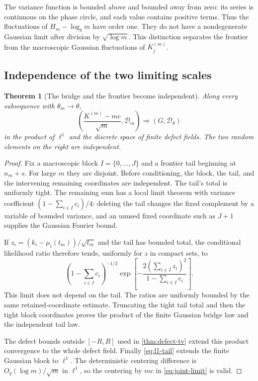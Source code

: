 \documentclass[11pt,a4paper]{article}
\numberwithin{equation}{section}
\newtheorem{theorem}{Theorem}[section]
\theoremstyle{definition}
\theoremstyle{remark}
\begin{document}
The variance function is bounded above and bounded away from zero: its
series is continuous on the phase circle, and each value contains positive
terms. Thus the fluctuations of $H_m-\log_bm$ have order one. They do
not have a nondegenerate Gaussian limit after division by
$\sqrt{\log m}$. This distinction separates the frontier from the
macroscopic Gaussian fluctuations of $K_j^{(m)}$.

\subsection{Independence of the two limiting scales}
\begin{theorem}[The bridge and the frontier become independent]
\label{thm:independence}
Along every subsequence with $\theta_m\to\theta$,
\begin{equation}
\left(\frac{K^{(m)}-mc}{\sqrt m},\mathcal D_m\right)
\Rightarrow (G,\mathcal D_\theta)
\label{eq:joint-limit}
\end{equation}
in the product of $\ell^1$ and the discrete space of finite defect fields.
The two random elements on the right are independent.
\end{theorem}
\begin{proof}
Fix a macroscopic block $I=\{0,\ldots,J\}$ and a frontier tail
beginning at $n_m+s$. For large $m$ they are disjoint. Before conditioning,
the block, the tail, and the intervening remaining coordinates are
independent. The tail's total is uniformly tight. The remaining sum has a
local limit theorem with variance coefficient
$(1-\sum_{i\in I}c_i)/4$: deleting the tail changes the fixed complement
by a variable of bounded variance, and an unused fixed coordinate such as
$J+1$ supplies the Gaussian Fourier bound.

If $z_i=(k_i-\mu_i(t_m))/\sqrt{t_m}$ and the tail has bounded total,
the conditional likelihood ratio therefore tends, uniformly for $z$ in
compact sets, to
\[
\left(1-\sum_{i\in I}c_i\right)^{-1/2}
\exp\left[-\frac{2(\sum_{i\in I}z_i)^2}
 {1-\sum_{i\in I}c_i}\right].
\]
This limit does not depend on the tail. The ratios are uniformly bounded
by the same retained-coordinate estimate. Truncating the tight tail total
and then the tight block coordinates proves the product of the finite
Gaussian bridge law and the independent tail law.

The defect bounds outside $[-R,R]$ used in
\cref{thm:defect-tv} extend this product convergence to the whole
defect field. Finally \cref{eq:l1-tail} extends the finite Gaussian
block to $\ell^1$. The deterministic centering difference is
$O_q(\log m)/\sqrt m$ in $\ell^1$, so the centering by $mc$ in
\cref{eq:joint-limit} is valid.
\end{proof}
\end{document}

